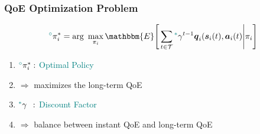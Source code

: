 \begin{frame}
	\frametitle{QoE Optimization Problem}

	\begin{alignat}{2}
		\textcolor{teal}{^\circ}\pi_i^* = \text{arg}\,\,  \max\limits_{\pi_i}  \mathbbm{E} \Bigg[ \sum\limits_{t \in \mathcal{T}}  \textcolor{teal}{^*}\gamma^{t-1}\boldsymbol{q}_i(\boldsymbol{s}_i(t),\boldsymbol{a}_i(t) \Bigg| \pi_i \Bigg]
		\label{24}  
	\end{alignat}	

\vfill 
\begin{enumerate}[]
	
	\item  \hspace{0mm}  $\textcolor{teal}{^\circ}\pi_i^*:$ \textcolor{teal}{Optimal Policy} 
	
	\item  \hspace{15mm} $\Rightarrow$ maximizes the long-term QoE
	
	\vspace{5mm}
	
	\item  \hspace{0mm}  $\textcolor{teal}{^*}\gamma \,\,\,:$ \textcolor{teal}{Discount Factor} 
	
	\item  \hspace{15mm}$\Rightarrow$ balance between instant QoE and  long-term QoE
	
	
\end{enumerate}

\end{frame}

